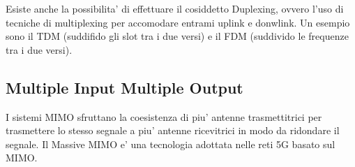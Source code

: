 Esiste anche la possibilita' di effettuare il cosiddetto Duplexing, ovvero l'uso di tecniche di multiplexing per accomodare entrami uplink e donwlink.
Un esempio sono il TDM (suddifido gli slot tra i due versi) e il FDM (suddivido le frequenze tra i due versi).


\subsection{Multiple Input Multiple Output}

I sistemi MIMO sfruttano la coesistenza di piu' antenne trasmettitrici per trasmettere lo stesso segnale a piu' antenne ricevitrici in modo da ridondare il segnale.
Il Massive MIMO e' una tecnologia adottata nelle reti 5G basato sul MIMO.

